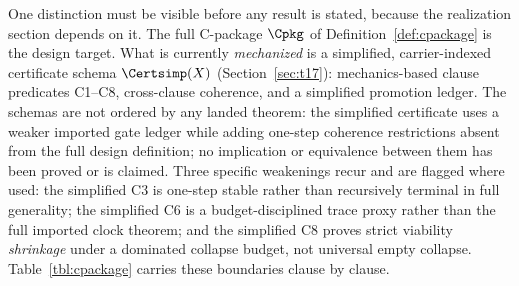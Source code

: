 One distinction must be visible before any result is stated, because the
realization section depends on it. The full C-package $\Cpkg$ of
Definition~\ref{def:cpackage} is the design target. What is currently
\emph{mechanized} is a simplified, carrier-indexed certificate schema
$\Certsimp(X)$ (Section~\ref{sec:t17}): mechanics-based clause predicates
C1--C8, cross-clause coherence, and a simplified promotion ledger. The schemas
are not ordered by any landed theorem: the simplified certificate uses a
weaker imported gate ledger while adding one-step coherence restrictions
absent from the full design definition; no implication or equivalence between
them has been proved or is claimed. Three specific weakenings recur and are
flagged where used: the simplified C3 is one-step stable rather than
recursively terminal in full generality; the simplified C6 is a
budget-disciplined trace proxy rather than the full imported clock theorem;
and the simplified C8 proves strict viability \emph{shrinkage} under a
dominated collapse budget, not universal empty collapse. Table~\ref{tbl:cpackage}
carries these boundaries clause by clause.

